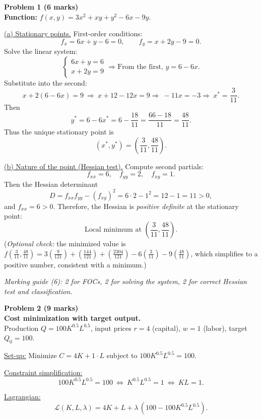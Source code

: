\documentclass[12pt]{article}
\begin{document}
\noindent\textbf{Problem 1 (6 marks)} \\
\textbf{Function: } $f(x,y)=3x^2+xy+y^2-6x-9y$.

\underline{(a) Stationary points.} First-order conditions:
\[
f_x = 6x + y - 6 = 0,\qquad
f_y = x + 2y - 9 = 0.
\]
Solve the linear system:
\[
\begin{cases}
6x + y = 6\\
x + 2y = 9
\end{cases}
\Rightarrow
\text{From the first, } y=6-6x.
\]
Substitute into the second:
\[
x + 2(6-6x) = 9 \ \Rightarrow\ x + 12 - 12x = 9
\Rightarrow\ -11x = -3 \Rightarrow\ x^*=\frac{3}{11}.
\]
Then
\[
y^* = 6 - 6x^* = 6 - \frac{18}{11} = \frac{66-18}{11}=\frac{48}{11}.
\]
Thus the unique stationary point is
\[
\boxed{(x^*,y^*)=\left(\frac{3}{11},\frac{48}{11}\right)}.
\]

\underline{(b) Nature of the point (Hessian test).} Compute second partials:
\[
f_{xx}=6,\quad f_{yy}=2,\quad f_{xy}=1.
\]
Then the Hessian determinant
\[
D = f_{xx}f_{yy} - (f_{xy})^2 = 6\cdot 2 - 1^2 = 12-1=11>0,
\]
and $f_{xx}=6>0$. Therefore, the Hessian is \emph{positive definite} at the stationary point:
\[
\boxed{\text{Local minimum at } \left(\frac{3}{11},\frac{48}{11}\right).}
\]
(\emph{Optional check:} the minimized value is
$f\!\left(\frac{3}{11},\frac{48}{11}\right)
= 3\left(\frac{9}{121}\right) + \left(\frac{144}{121}\right) + \left(\frac{2304}{121}\right) - 6\left(\frac{3}{11}\right) - 9\left(\frac{48}{11}\right)$,
which simplifies to a positive number, consistent with a minimum.)

\medskip
\noindent\textit{Marking guide (6): 2 for FOCs, 2 for solving the system, 2 for correct Hessian test and classification.}

\newpage

\noindent\textbf{Problem 2 (9 marks)} \\
\textbf{Cost minimization with target output.} \\
Production $Q = 100K^{0.5} L^{0.5}$, input prices $r=4$ (capital), $w=1$ (labor), target $Q_0=100$.

\underline{Set-up:} Minimize $C=4K + 1\cdot L$ subject to $100K^{0.5}L^{0.5}=100$.

\underline{Constraint simplification:}
\[
100K^{0.5}L^{0.5}=100 \ \Longleftrightarrow\ K^{0.5}L^{0.5}=1 \ \Longleftrightarrow\ KL=1.
\]

\underline{Lagrangian:}
\[
\mathcal{L}(K,L,\lambda) = 4K + L + \lambda\,(100 - 100K^{0.5}L^{0.5}).
\]
\end{document}
